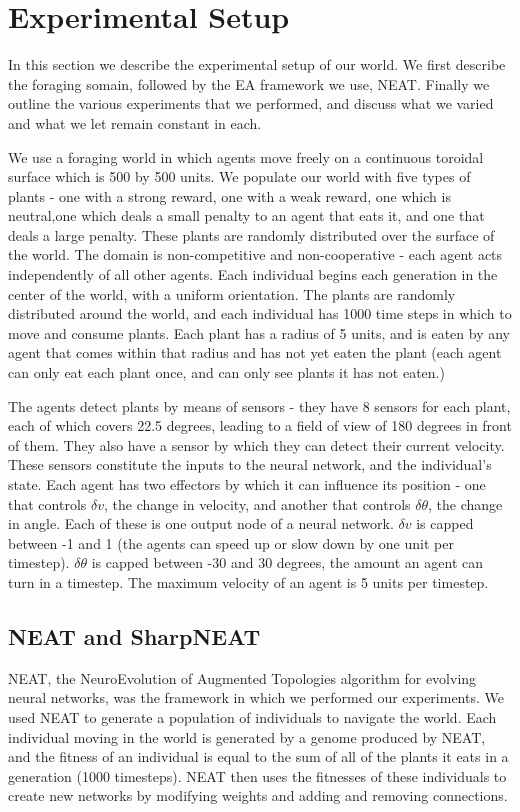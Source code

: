 \documentclass{acm_proc_article-sp}
\begin{document}
\section{Experimental Setup}
\label{sec:setup}
In this section we describe the experimental setup of our world.
We first describe the foraging somain, followed by the EA framework we use, NEAT.  Finally we outline the various experiments that we performed, and discuss what we varied and what we let remain constant in each.

    We use a foraging world in which agents move freely on a continuous toroidal surface which is 500 by 500 units.  
We populate our world with five types of plants - one with a strong reward, one with a weak reward, one which is neutral,one which deals a small penalty to an agent that eats it, and one that deals a large penalty.  
These plants are randomly distributed over the surface of the world.
  The domain is non-competitive and non-cooperative - each agent acts independently of all other agents.
  Each individual begins each generation in the center of the world, with a uniform orientation.
  The plants are randomly distributed around the world, and each individual has 1000 time steps in which to move and consume plants.
  Each plant has a radius of 5 units, and is eaten by any agent that comes within that radius and has not yet eaten the plant (each agent can only eat each plant once, and can only see plants it has not eaten.)
  
 The agents detect plants by means of sensors - they have 8 sensors for each plant, each of which covers 22.5 degrees, leading to a field of view of 180 degrees in front of them.
   They also have a sensor by which they can detect their current velocity.
   These sensors constitute the inputs to the neural network, and the individual's state.
Each agent has two effectors by which it can influence its position - one that controls $\delta v$, the change in velocity, and another that controls $\delta \theta$, the change in angle.
Each of these is one output node of a neural network.
  $\delta v$ is capped between -1 and 1 (the agents can speed up or slow down by one unit per timestep).
  $\delta \theta$ is capped between -30 and 30 degrees, the amount an agent can turn in a timestep.
  The maximum velocity of an agent is 5 units per timestep.
\subsection*{NEAT and SharpNEAT}
NEAT, the NeuroEvolution of Augmented Topologies algorithm for evolving neural networks, was the framework in which we performed our experiments.  
We used NEAT to generate a population of individuals to navigate the world.  
Each individual moving in the world is generated by a genome produced by NEAT, and the fitness of an individual is equal to the sum of all of the plants it eats in a generation (1000 timesteps).
NEAT then uses the fitnesses of these individuals to create new networks by modifying weights and adding and removing connections.
\end{document}
